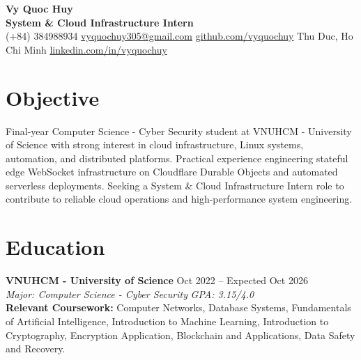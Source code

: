 \documentclass[10pt,a4paper]{article}
\begin{document}
\pagestyle{empty}

\begin{center}
    {\huge \textbf{Vy Quoc Huy}} \\ \vspace{4pt}
    {\Large \textbf{System & Cloud Infrastructure Intern}} \\ \vspace{4pt}
    (+84) 384988934 \quad \href{mailto:vyquochuy305@gmail.com}{vyquochuy305@gmail.com} \quad \href{https://github.com/vyquochuy}{github.com/vyquochuy} \quad Thu Duc, Ho Chi Minh \quad \href{https://www.linkedin.com/in/vyquochuy/}{linkedin.com/in/vyquochuy}
\end{center}

\section*{Objective}
Final-year Computer Science - Cyber Security student at VNUHCM - University of Science with strong interest in cloud infrastructure, Linux systems, automation, and distributed platforms. Practical experience engineering stateful edge WebSocket infrastructure on Cloudflare Durable Objects and automated serverless deployments. Seeking a System \& Cloud Infrastructure Intern role to contribute to reliable cloud operations and high-performance system engineering.

\section*{Education}
\noindent \textbf{VNUHCM - University of Science} \hfill Oct 2022 -- Expected Oct 2026\\
\textit{Major: Computer Science - Cyber Security} \hfill \textit{GPA: 3.15/4.0}\\
\textbf{Relevant Coursework:} Computer Networks, Database Systems, Fundamentals of Artificial Intelligence, Introduction to Machine Learning, Introduction to Cryptography, Encryption Application, Blockchain and Applications, Data Safety and Recovery.

\end{document}
